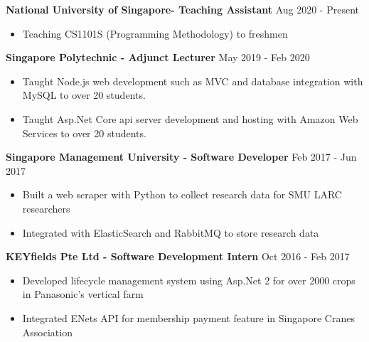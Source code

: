 \documentclass[11pt]{article} %
\begin{document}
\medskip

\textbf{National University of Singapore- Teaching Assistant} \hfill Aug 2020 - Present

\smallskip
\begin{itemize}

    \item Teaching CS1101S (Programming Methodology) to freshmen

\end{itemize}

\medskip

\textbf{Singapore Polytechnic - Adjunct Lecturer} \hfill May 2019 - Feb 2020

\smallskip
\begin{itemize}

    \item Taught Node.js web development such as MVC and database integration with MySQL to over 20 students.
    \item Taught Asp.Net Core api server development and hosting with Amazon Web Services to over 20 students.

\end{itemize}

\medskip

\textbf{Singapore Management University - Software Developer} \hfill Feb 2017 - Jun 2017

\smallskip
\begin{itemize}

    \item Built a web scraper with Python to collect research data for SMU LARC researchers
    \item Integrated with ElasticSearch and RabbitMQ to store research data

\end{itemize}

\medskip

\textbf{KEYfields Pte Ltd - Software Development Intern} \hfill Oct 2016 - Feb 2017

\smallskip
\begin{itemize}

    \item Developed lifecycle management system using Asp.Net 2 for over 2000 crops in Panasonic's vertical farm
    \item Integrated ENets API for membership payment feature in Singapore Cranes Association

\end{itemize}
\end{document}
